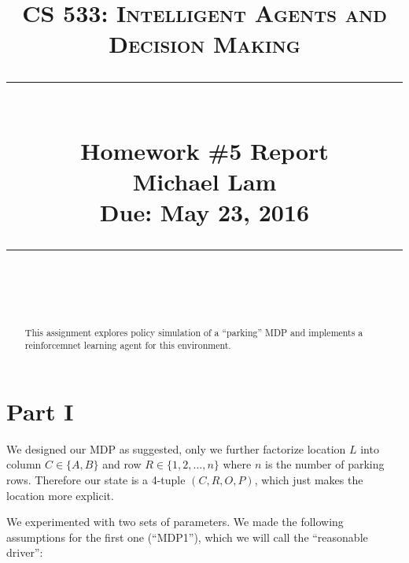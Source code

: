\documentclass[paper=a4, fontsize=11pt]{scrartcl}
\newcommand{\lecture}{Homework \#5 Report} %
\newcommand{\lecturedate}{Due: May 23, 2016} %
\newcommand{\scribe}{Michael Lam} %
\begin{document}
\newcommand{\horrule}[1]{\rule{\linewidth}{#1}} %

\title{	
\normalfont \normalsize
\vspace{-30pt}
\textsc{CS 533: Intelligent Agents and Decision Making} \\ [10pt]
\horrule{0.5pt} \\[0.4cm] %
\LARGE \lecture\\ %
\vspace{5pt}
\normalsize \scribe\\
\lecturedate\\
\horrule{2pt} \\[0.5cm] %
}


\date{} %

\maketitle
\vspace{-100pt}

\begin{abstract}
This assignment explores policy simulation of a ``parking'' MDP and implements a reinforcemnet learning agent for this environment.
\end{abstract}

\section{Part I}

We designed our MDP as suggested, only we further factorize location $L$ into column $C \in \{A, B\}$ and row $R \in \{1, 2, \ldots, n\}$ where $n$ is the number of parking rows. Therefore our state is a 4-tuple $(C, R, O, P)$, which just makes the location more explicit.

We experimented with two sets of parameters. We made the following assumptions for the first one (``MDP1''), which we will call the ``reasonable driver'':
\end{document}
